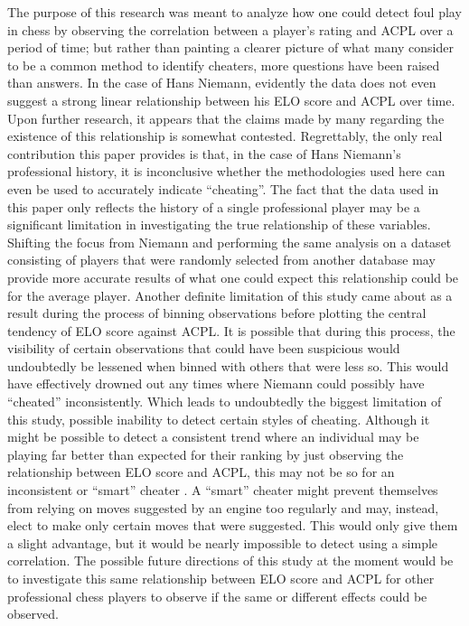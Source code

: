 \documentclass[12pt, letterpaper, titlepage]{article}
\begin{document}
The purpose of this research was meant to analyze how one could detect foul play in chess by observing the 
correlation between a player's rating and ACPL over a period of time; but rather than painting a clearer 
picture of what many consider to be a common method to identify cheaters, more questions have been raised than
 answers. In the case of Hans Niemann, evidently the data does not even suggest a strong linear relationship
  between his ELO score and ACPL over time. Upon further research, it appears that the claims made by many
   regarding the existence of this relationship is somewhat contested. Regrettably, the only real contribution 
   this paper provides is that, in the case of Hans Niemann's professional history, it is inconclusive whether 
   the methodologies used here can even be used to accurately indicate “cheating”. The fact that the data used 
   in this paper only reflects the history of a single professional player may be a significant limitation in 
   investigating the true relationship of these variables. Shifting the focus from Niemann and performing the 
   same analysis on a dataset consisting of players that were randomly selected from another database may 
   provide more accurate results of what one could expect this relationship could be for the average player. 
   Another definite limitation of this study came about as a result during the process of binning observations 
   before plotting the central tendency of ELO score against ACPL. It is possible that during this process, 
   the visibility of certain observations that could have been suspicious would undoubtedly be lessened when
    binned with others that were less so. This would have effectively drowned out any times where Niemann 
    could possibly have “cheated” inconsistently. Which leads to undoubtedly the biggest limitation of this 
    study, possible inability to detect certain styles of cheating. Although it might be possible to detect a 
    consistent trend where an individual may be playing far better than expected for their ranking by just 
    observing the relationship between ELO score and ACPL, this may not be so for an inconsistent or “smart” 
    cheater \citep{chessbot}. A “smart” cheater might prevent themselves from relying on moves suggested by 
    an engine too regularly and may, instead, elect to make only certain moves that were suggested. This would 
    only give them a slight advantage, but it would be nearly impossible to detect using a simple correlation.
     The possible future directions of this study at the moment would be to investigate this same relationship
      between ELO score and ACPL for other professional chess players to observe if the same or different 
      effects could be observed.
\end{document}
